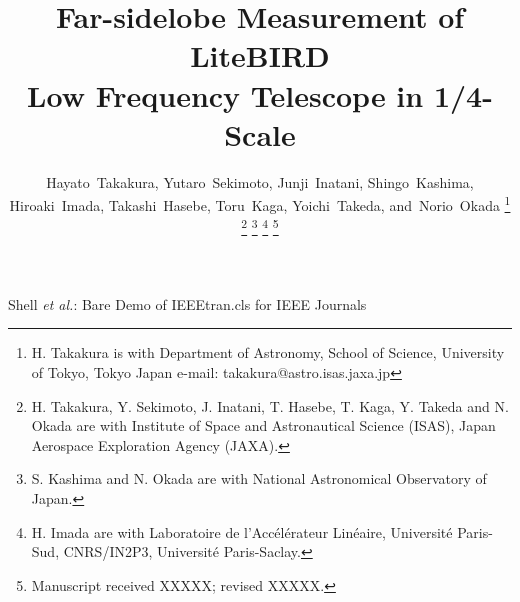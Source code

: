 \documentclass[journal]{IEEEtran}
\begin{document}
%
\title{Far-sidelobe Measurement of LiteBIRD \\ Low Frequency Telescope in 1/4-Scale}
%
%
\author{Hayato~Takakura, Yutaro~Sekimoto, Junji~Inatani, Shingo~Kashima, Hiroaki~Imada, Takashi~Hasebe, Toru~Kaga, Yoichi~Takeda, and~Norio~Okada%
\thanks{H. Takakura is with Department of Astronomy, School of Science, University of Tokyo, Tokyo Japan e-mail: takakura@astro.isas.jaxa.jp}%
\thanks{H. Takakura, Y. Sekimoto, J. Inatani, T. Hasebe, T. Kaga, Y. Takeda and N. Okada are with Institute of Space and Astronautical Science (ISAS), Japan Aerospace Exploration Agency (JAXA).}%
\thanks{S. Kashima and N. Okada are with National Astronomical Observatory of Japan.}%
\thanks{H. Imada are with Laboratoire de l'Accélérateur Linéaire, Université Paris-Sud, CNRS/IN2P3, Université Paris-Saclay.}%
\thanks{Manuscript received XXXXX; revised XXXXX.}}
%
%
{Shell \MakeLowercase{\textit{et al.}}: Bare Demo of IEEEtran.cls for IEEE Journals}
% 
%
%
%
\maketitle
%
\end{document}
